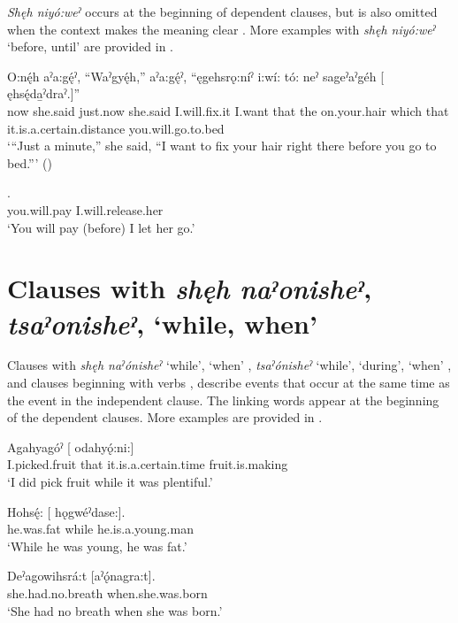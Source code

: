 \textit{Shęh niyó:weˀ} occurs at the beginning of dependent clauses, but is also omitted when the context makes the meaning clear . More examples with \textit{shęh niyó:weˀ} ‘before, until’ are provided in .

\ea\label{ex:before20} 
\gll O:nę́h aˀa:gę́ˀ, “Waˀgyę́h,” aˀa:gę́ˀ, “ęgehsrǫ:níˀ i:wí: tó: neˀ sageˀaˀgéh [     ęhsę́da̱ˀdraˀ.]” \\
now she.said just.now she.said I.will.fix.it I.want that the on.your.hair which that it.is.a.certain.distance you.will.go.to.bed \\
\glt ‘“Just a minute,” she said, “I want to fix your hair right there before you go to bed.”’ (\cite{henry_de_2005})
\z

\ea\label{ex:beforuntilex2}
. \\
you.will.pay I.will.release.her\\
\glt ‘You will pay (before) I let her go.’ 
\z




\section{Clauses with \textit{shęh naˀonisheˀ}, \textit{tsaˀonisheˀ},  ‘while, when’} \label{ch:Clauses with [shęh naˀonisheˀ], [tsaˀonisheˀ], [tsi-] ‘while, when’}
Clauses with \textit{shęh naˀónisheˀ} ‘while’, ‘when’ , \textit{tsaˀónisheˀ} ‘while’, ‘during’, ‘when’ , and clauses beginning with  \textsc{\coincident} verbs , describe events that occur at the same time as the event in the independent clause. The linking words appear at the beginning of the dependent clauses. More examples are provided in .

\ea\label{ex:whilewhenex} 
\gll Agahyagóˀ [   odahyǫ́:ni:]\\
I.picked.fruit that it.is.a.certain.time fruit.is.making\\
\glt ‘I did pick fruit while it was plentiful.’
\z

\ea\label{ex:whilewhenex2} 
\gll Hohsę́: [ hǫgwéˀdase:]. \\
he.was.fat while he.is.a.young.man\\
\glt ‘While he was young, he was fat.’ 
\z

\ea\label{ex:whilewhenex3} 
\gll Deˀagowihsrá:t [aˀǫ́nagra:t]. \\
she.had.no.breath when.she.was.born\\
\glt ‘She had no breath when she was born.’
\z
